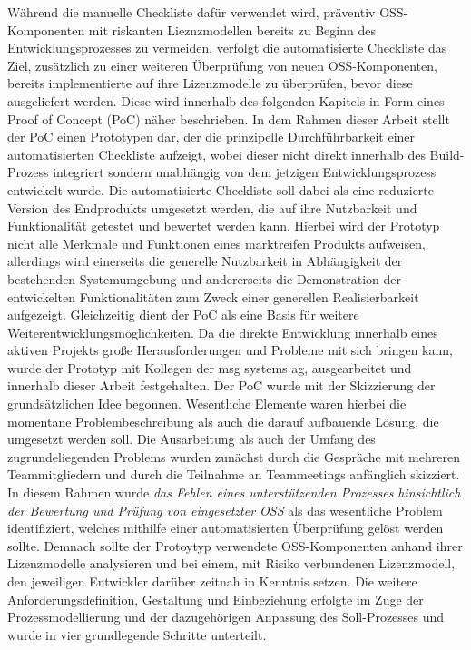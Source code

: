 Während die manuelle Checkliste dafür verwendet wird, präventiv OSS-Komponenten mit riskanten Lieznzmodellen bereits zu Beginn des Entwicklungsprozesses zu vermeiden, verfolgt die automatisierte Checkliste das Ziel, zusätzlich zu einer weiteren Überprüfung von neuen OSS-Komponenten, bereits implementierte auf ihre Lizenzmodelle zu überprüfen, bevor diese ausgeliefert werden. Diese wird innerhalb des folgenden Kapitels in Form eines Proof of Concept (PoC) näher beschrieben. In dem Rahmen dieser Arbeit stellt der PoC einen Prototypen dar, der die prinzipelle Durchführbarkeit einer automatisierten Checkliste aufzeigt, wobei dieser nicht direkt innerhalb des Build-Prozess integriert sondern unabhängig von dem jetzigen Entwicklungsprozess entwickelt wurde. Die automatisierte Checkliste soll dabei als eine reduzierte Version des Endprodukts umgesetzt werden, die auf ihre Nutzbarkeit und Funktionalität getestet und bewertet werden kann. Hierbei wird der Prototyp nicht alle Merkmale und Funktionen eines marktreifen Produkts aufweisen, allerdings wird einerseits die generelle Nutzbarkeit in Abhängigkeit der bestehenden Systemumgebung und andererseits die Demonstration der entwickelten Funktionalitäten zum Zweck einer generellen Realisierbarkeit aufgezeigt. \cite{dreher_prototyping_2018} Gleichzeitig dient der PoC als eine Basis für weitere Weiterentwicklungsmöglichkeiten. Da die direkte Entwicklung innerhalb eines aktiven Projekts große Herausforderungen und Probleme mit sich bringen kann, wurde der Prototyp mit Kollegen der msg systems ag, ausgearbeitet und innerhalb dieser Arbeit festgehalten. Der PoC wurde mit der Skizzierung der grundsätzlichen Idee begonnen. Wesentliche Elemente waren hierbei die momentane Problembeschreibung als auch die darauf aufbauende Lösung, die umgesetzt werden soll. Die Ausarbeitung als auch der Umfang des zugrundeliegenden Problems wurden zunächst durch die Gespräche mit mehreren Teammitgliedern und durch die Teilnahme an Teammeetings anfänglich skizziert. In diesem Rahmen wurde \textit{das Fehlen eines unterstützenden Prozesses hinsichtlich der Bewertung und Prüfung von eingesetzter OSS} als das wesentliche Problem identifiziert, welches mithilfe einer automatisierten Überprüfung gelöst werden sollte. Demnach sollte der Protoytyp verwendete OSS-Komponenten anhand ihrer Lizenzmodelle analysieren und bei einem, mit Risiko verbundenen Lizenzmodell, den jeweiligen Entwickler darüber zeitnah in Kenntnis setzen. Die weitere Anforderungsdefinition, Gestaltung und Einbeziehung erfolgte im Zuge der Prozessmodellierung und der dazugehörigen Anpassung des Soll-Prozesses und wurde in vier grundlegende Schritte unterteilt.



